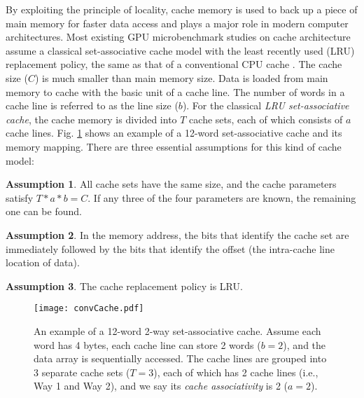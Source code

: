 \documentclass[10pt,journal,compsoc]{IEEEtran}
\theoremstyle{definition}
\newtheorem{cor}{Assumption}
\begin{document}
By exploiting the principle of locality, cache memory is used to back up a piece of main memory for faster data access and plays a major role in modern computer architectures. Most existing GPU microbenchmark studies on cache architecture assume a classical set-associative cache model with the least recently used (LRU) replacement policy, the same as that of a conventional CPU cache \cite{saavedra1992cpu, saavedra1995measuring}. The cache size ($C$) is much smaller than main memory size. Data is loaded from main memory to cache with the basic unit of a cache line. The number of words in a cache line is referred to as the line size ($b$). For the classical \emph{LRU set-associative cache}, the cache memory is divided into $T$ cache sets, each of which consists of $a$ cache lines. Fig. \ref{fig:covCache} shows an example of a 12-word set-associative cache and its memory mapping. There are three essential assumptions for this kind of cache model:

\begin{cor}
\label{def:cond1}
All cache sets have the same size, and the cache parameters satisfy $T*a*b=C$. If any three of the four parameters are known, the remaining one can be found.
\end{cor}

\begin{cor}
\label{def:cond2}
In the memory address, the bits that identify the cache set are immediately followed by the bits that identify the offset (the intra-cache line location of data).
\end{cor}

\begin{cor}
\label{def:cond3}
The cache replacement policy is LRU.
\end{cor}

\begin{figure}
  \centering
  \texttt{[image: convCache.pdf]}
  \caption{An example of a 12-word 2-way set-associative cache. Assume each word has 4 bytes, each cache line can store 2 words ($b=2$), and the data array is sequentially accessed. The cache lines are grouped into 3 separate cache sets ($T=3$), each of which has 2 cache lines (i.e., Way 1 and Way 2), and we say its \emph{cache associativity} is 2 ($a=2$). }
  \label{fig:covCache}
\end{figure}
\end{document}
